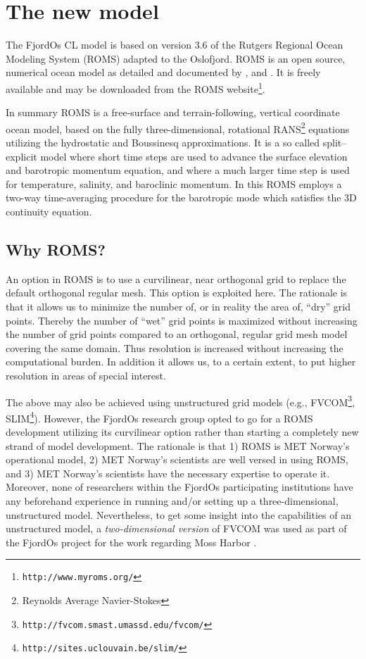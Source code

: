 \clearpage
\section{The new model}
\label{sec:model}
The FjordOs CL model is based on version 3.6 of the Rutgers Regional Ocean Modeling System (ROMS) adapted to the Oslofjord. ROMS is an open source, numerical ocean model as detailed and documented by \cite{haidv:etal:2008}, \cite{shche:mcwil:2003} and \cite{shche:mcwil:2005, shche:mcwil:2009}. It is freely available and may be downloaded from the ROMS website\footnote{\texttt{http://www.myroms.org/}}. 

In summary ROMS is a free-surface and terrain-following, vertical coordinate ocean model, based on the fully three-dimensional, rotational RANS\footnote{Reynolds Average Navier-Stokes} equations utilizing the hydrostatic and Boussinesq approximations. It is a so called split–explicit model where short time steps are used to advance the surface elevation and barotropic momentum equation, and where a much larger time step is used for temperature, salinity, and baroclinic momentum. In this ROMS employs a two-way time-averaging procedure for the barotropic mode which satisfies the 3D continuity equation. 

\subsection{Why ROMS?}
An option in ROMS is to use a curvilinear, near orthogonal grid to replace the default orthogonal regular mesh. This option is exploited here. The rationale is that it allows us to minimize the number of, or in reality the area of, ``dry'' grid points. Thereby the number of ``wet'' grid points is maximized without increasing the number of grid points compared to an orthogonal, regular grid mesh model covering the same domain. Thus resolution is increased without increasing the computational burden. In addition it allows us, to a certain extent, to put higher resolution in areas of special interest.
%

The above may also be achieved using unstructured grid models (e.g., FVCOM\footnote{\texttt{http://fvcom.smast.umassd.edu/fvcom/}}, SLIM\footnote{\texttt{http://sites.uclouvain.be/slim/}}). However, the FjordOs research group opted to go for a ROMS development utilizing its curvilinear option rather than starting a completely new strand of model development. The rationale is that 1) ROMS is MET Norway's operational model, 2) MET Norway's scientists are well versed in using ROMS, and 3) MET Norway's scientists have the necessary expertise to operate it. Moreover, none of researchers within the FjordOs participating institutions have any beforehand experience in running and/or setting up a three-dimensional, unstructured model. Nevertheless, to get some insight into the capabilities of an unstructured model, a \emph{two-dimensional version} of FVCOM was used as part of the FjordOs project for the work regarding Moss Harbor \citep{hjelm:etal:2014}.  
   

